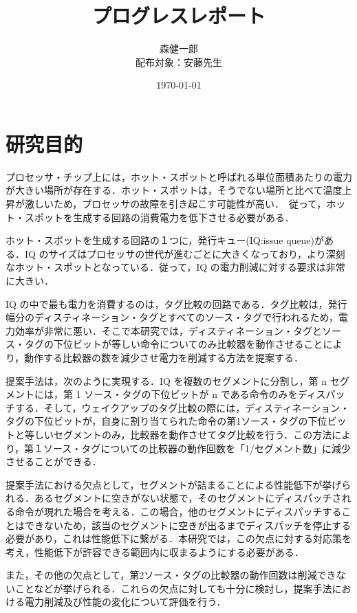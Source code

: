 \documentclass[twocolumn]{jsarticle}
\begin{document}
  \title{プログレスレポート}
  \date{\today}
  \author{森健一郎\\配布対象：安藤先生}
  
  \maketitle
  
  \section{研究目的}
  プロセッサ・チップ上には，ホット・スポットと呼ばれる単位面積あたりの電力が大きい場所が存在する．ホット・スポットは，そうでない場所と比べて温度上昇が激しいため，プロセッサの故障を引き起こす可能性が高い．~\cite{Weste2010,Monsieur2001,Khan2010,Black1969,Viswanath2000}従って，ホット・スポットを生成する回路の消費電力を低下させる必要がある．

  ホット・スポットを生成する回路の１つに，発行キュー(IQ:issue queue)がある．IQ のサイズはプロセッサの世代が進むごとに大きくなっており，より深刻なホット・スポットとなっている．従って，IQ の電力削減に対する要求は非常に大きい．
  
  IQ の中で最も電力を消費するのは，タグ比較の回路である．タグ比較は，発行幅分のディスティネーション・タグとすべてのソース・タグで行われるため，電力効率が非常に悪い．そこで本研究では，ディスティネーション・タグとソース・タグの下位ビットが等しい命令についてのみ比較器を動作させることにより，動作する比較器の数を減少させ電力を削減する方法を提案する．

  提案手法は，次のように実現する．IQ を複数のセグメントに分割し，第 n セグメントには，第 1 ソース・タグの下位ビットが n である命令のみをディスパッチする．そして，ウェイクアップのタグ比較の際には，ディスティネーション・タグの下位ビットが，自身に割り当てられた命令の第1ソース・タグの下位ビットと等しいセグメントのみ，比較器を動作させてタグ比較を行う．この方法により，第１ソース・タグについての比較器の動作回数を「1/セグメント数」に減少させることができる．

  提案手法における欠点として，セグメントが詰まることによる性能低下が挙げられる．あるセグメントに空きがない状態で，そのセグメントにディスパッチされる命令が現れた場合を考える．この場合，他のセグメントにディスパッチすることはできないため，該当のセグメントに空きが出るまでディスパッチを停止する必要があり，これは性能低下に繋がる．本研究では，この欠点に対する対応策を考え，性能低下が許容できる範囲内に収まるようにする必要がある．

  また，その他の欠点として，第2ソース・タグの比較器の動作回数は削減できないことなどが挙げられる．これらの欠点に対しても十分に検討し，提案手法における電力削減及び性能の変化について評価を行う．
\end{document}
